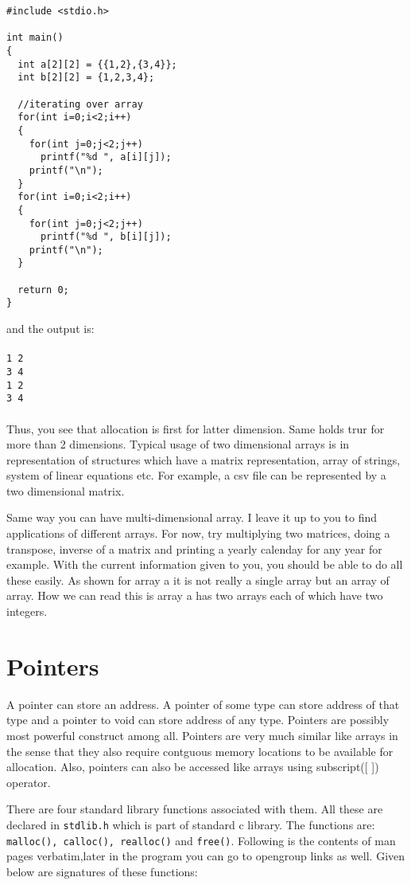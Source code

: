 \begin{verbatim}
#include <stdio.h>

int main()
{
  int a[2][2] = {{1,2},{3,4}};
  int b[2][2] = {1,2,3,4};

  //iterating over array
  for(int i=0;i<2;i++)
  {
    for(int j=0;j<2;j++)
      printf("%d ", a[i][j]);
    printf("\n");
  }
  for(int i=0;i<2;i++)
  {
    for(int j=0;j<2;j++)
      printf("%d ", b[i][j]);
    printf("\n");
  }

  return 0;
}
\end{verbatim}
and the output is:
\\\\\texttt{1 2\\
3 4\\
1 2\\
3 4\\\\}
Thus, you see that allocation is first for latter dimension. Same holds trur
for more than 2 dimensions. Typical usage of two dimensional arrays is in
representation of structures which have a matrix representation, array of
strings, system of linear equations etc. For example, a csv file can be
represented by a two dimensional matrix.

Same way you can have multi-dimensional array. I leave it up to you to find
applications of different arrays. For now, try multiplying two matrices, doing
a transpose, inverse of a matrix and printing a yearly calenday for any year
for example. With the current information given to you, you should be able to
do all these easily. As shown for array a it is not really a single array but
an array of array. How we can read this is array a has two arrays each of which
have two integers.

\section{Pointers}
A pointer can store an address. A pointer of some type can store address of
that type and a pointer to void can store address of any type. Pointers are
possibly most powerful construct among all. Pointers are very much similar like
arrays in the sense that they also require contguous memory locations to be
available for allocation. Also, pointers can also be accessed like arrays using
subscript([ ]) operator.

There are four standard library functions associated with them. All these are
declared in \texttt{stdlib.h} which is part of standard c library. The
functions are: \texttt{malloc(), calloc(), realloc()} and
\texttt{free()}. Following is the contents of man pages verbatim,later in the
program you can go to opengroup links as well. Given below are signatures of
these functions:

